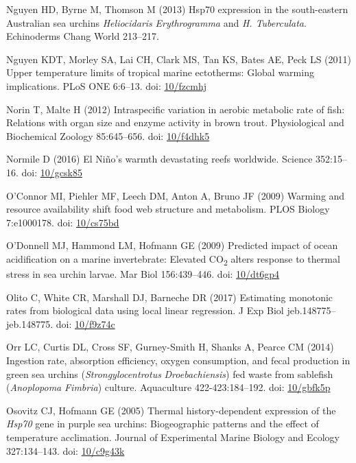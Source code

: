 \documentclass[a4paper,10pt, oneside]{memoir}
\begin{document}
\leavevmode\hypertarget{ref-Nguyen2013}{}%
Nguyen HD, Byrne M, Thomson M (2013) Hsp70 expression in the south-eastern Australian sea urchins \emph{Heliocidaris} \emph{Erythrogramma} and \emph{H}\emph{. Tuberculata}. Echinoderms Chang World 213--217.

\leavevmode\hypertarget{ref-Nguyen2011}{}%
Nguyen KDT, Morley SA, Lai CH, Clark MS, Tan KS, Bates AE, Peck LS (2011) Upper temperature limits of tropical marine ectotherms: Global warming implications. PLoS ONE 6:6--13. doi: \href{https://doi.org/10/fzcmhj}{10/fzcmhj}

\leavevmode\hypertarget{ref-Norin2012}{}%
Norin T, Malte H (2012) Intraspecific variation in aerobic metabolic rate of fish: Relations with organ size and enzyme activity in brown trout. Physiological and Biochemical Zoology 85:645--656. doi: \href{https://doi.org/10/f4dhk5}{10/f4dhk5}

\leavevmode\hypertarget{ref-Normile2016}{}%
Normile D (2016) El Niño's warmth devastating reefs worldwide. Science 352:15--16. doi: \href{https://doi.org/10/gcsk85}{10/gcsk85}

\leavevmode\hypertarget{ref-OConnor2009}{}%
O'Connor MI, Piehler MF, Leech DM, Anton A, Bruno JF (2009) Warming and resource availability shift food web structure and metabolism. PLOS Biology 7:e1000178. doi: \href{https://doi.org/10/cs75bd}{10/cs75bd}

\leavevmode\hypertarget{ref-ODonnell2009}{}%
O'Donnell MJ, Hammond LM, Hofmann GE (2009) Predicted impact of ocean acidification on a marine invertebrate: Elevated CO\textsubscript{2} alters response to thermal stress in sea urchin larvae. Mar Biol 156:439--446. doi: \href{https://doi.org/10/dt6gp4}{10/dt6gp4}

\leavevmode\hypertarget{ref-Olito2017}{}%
Olito C, White CR, Marshall DJ, Barneche DR (2017) Estimating monotonic rates from biological data using local linear regression. J Exp Biol jeb.148775--jeb.148775. doi: \href{https://doi.org/10/f9z74c}{10/f9z74c}

\leavevmode\hypertarget{ref-Orr2014}{}%
Orr LC, Curtis DL, Cross SF, Gurney-Smith H, Shanks A, Pearce CM (2014) Ingestion rate, absorption efficiency, oxygen consumption, and fecal production in green sea urchins (\emph{Strongylocentrotus} \emph{Droebachiensis}) fed waste from sablefish (\emph{Anoplopoma} \emph{Fimbria}) culture. Aquaculture 422-423:184--192. doi: \href{https://doi.org/10/gbfk5p}{10/gbfk5p}

\leavevmode\hypertarget{ref-Osovitz2005}{}%
Osovitz CJ, Hofmann GE (2005) Thermal history-dependent expression of the \emph{Hsp70} gene in purple sea urchins: Biogeographic patterns and the effect of temperature acclimation. Journal of Experimental Marine Biology and Ecology 327:134--143. doi: \href{https://doi.org/10/c9g43k}{10/c9g43k}
\end{document}
